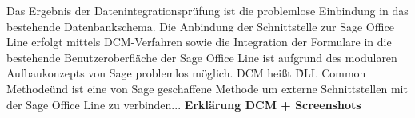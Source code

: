 Das Ergebnis der Datenintegrationsprüfung ist die problemlose Einbindung in das bestehende Datenbankschema. Die Anbindung der Schnittstelle zur Sage Office Line erfolgt mittels DCM-Verfahren sowie die Integration der Formulare in die bestehende Benutzeroberfläche der Sage Office Line ist aufgrund des modularen Aufbaukonzepts von Sage problemlos möglich. DCM heißt \"DLL Common Methode\" und ist eine von Sage geschaffene Methode um externe Schnittstellen mit der Sage Office Line zu verbinden... \textbf{Erklärung DCM + Screenshots}